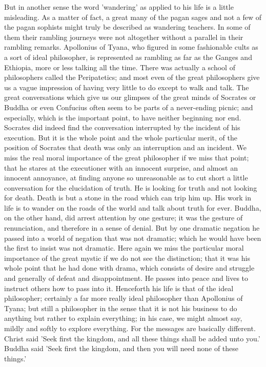 But in another sense the word 'wandering' as applied to his life is a little misleading. As a matter of fact, a great many of the pagan sages and not a few of the pagan sophists might truly be described as wandering teachers. In some of them their rambling journeys were not altogether without a parallel in their rambling remarks. Apollonius of Tyana, who figured in some fashionable cults as a sort of ideal philosopher, is represented as rambling as far as the Ganges and Ethiopia, more or less talking all the time. There was actually a school of philosophers called the Peripatetics; and most even of the great philosophers give us a vague impression of having very little to do except to walk and talk. The great conversations which give us our glimpses of the great minds of Socrates or Buddha or even Confucius often seem to be parts of a never-ending picnic; and especially, which is the important point, to have neither beginning nor end. Socrates did indeed find the conversation interrupted by the incident of his execution. But it is the whole point and the whole particular merit, of the position of Socrates that death was only an interruption and an incident. We miss the real moral importance of the great philosopher if we miss that point; that he stares at the executioner with an innocent surprise, and almost an innocent annoyance, at finding anyone so unreasonable as to cut short a little conversation for the elucidation of truth. He is looking for truth and not looking for death. Death is but a stone in the road which can trip him up. His work in life is to wander on the roads of the world and talk about truth for ever. Buddha, on the other hand, did arrest attention by one gesture; it was the gesture of renunciation, and therefore in a sense of denial. But by one dramatic negation he passed into a world of negation that was not dramatic; which he would have been the first to insist was not dramatic. Here again we miss the particular moral importance of the great mystic if we do not see the distinction; that it was his whole point that he had done with drama, which consists of desire and struggle and generally of defeat and disappointment. He passes into peace and lives to instruct others how to pass into it. Henceforth his life is that of the ideal philosopher; certainly a far more really ideal philosopher than Apollonius of Tyana; but still a philosopher in the sense that it is not his business to do anything but rather to explain everything; in his case, we might almost say, mildly and softly to explore everything. For the messages are basically different. Christ said 'Seek first the kingdom, and all these things shall be added unto you.' Buddha said 'Seek first the kingdom, and then you will need none of these things.'

